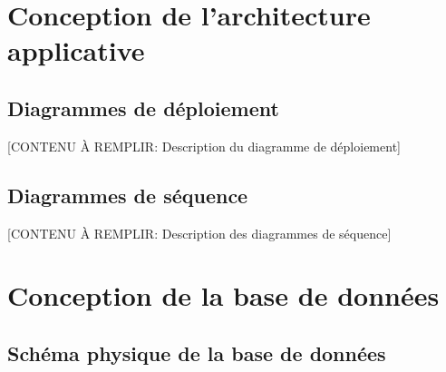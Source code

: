 \section{Conception de l'architecture applicative}


\subsection{Diagrammes de déploiement}

[CONTENU À REMPLIR: Description du diagramme de déploiement]


\subsection{Diagrammes de séquence}


[CONTENU À REMPLIR: Description des diagrammes de séquence]


\section{Conception de la base de données}


\subsection{Schéma physique de la base de données}

